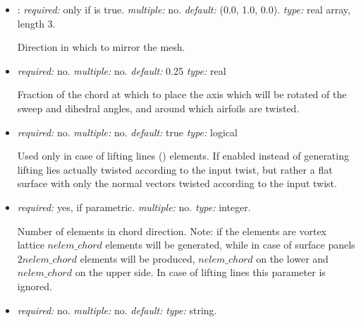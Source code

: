 \begin{itemize}
point around which to mirror the mesh.

\item {}: \textit{required:} only if  is true. 
\textit{multiple:} no. \textit{default:} (0.0, 1.0, 0.0). \textit{type:} real array, length 3.

Direction in which to mirror the mesh.

\item {} \textit{required:} no. \textit{multiple:} no. 
\textit{default:} 0.25 \textit{type:} real

Fraction of the chord at which to place the axis which will be rotated of the sweep 
and dihedral angles, and around which airfoils are twisted. 

\item {} \textit{required:} no. \textit{multiple:} no. 
\textit{default:} true \textit{type:} logical

Used only in case of lifting lines () elements. If enabled instead of 
generating lifting lies actually twisted according to the input twist, 
but rather a flat surface with only the normal vectors twisted according 
to the input twist. 

\item {} \textit{required:} yes, if parametric. 
\textit{multiple:} no. \textit{type:} integer.

Number of elements in chord direction. Note: if the elements are vortex 
lattice $nelem\_chord$ elements will be generated, while in case of 
surface panels $2nelem\_chord$ elements will be produced, $nelem\_chord$ 
on the lower and $nelem\_chord$ on the upper side. In case of lifting lines 
this parameter is ignored.

\item {} \textit{required:} no. \textit{multiple:} no. 
\textit{default:}  \textit{type:} string.


\end{itemize}
